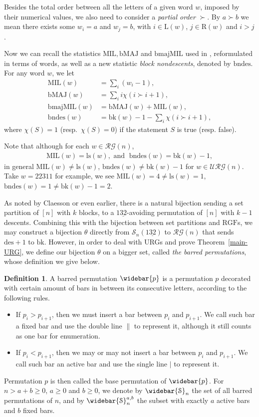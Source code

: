 \documentclass[12pt]{amsart}
\numberwithin{equation}{section}
\theoremstyle{plain}
\theoremstyle{definition}
\newtheorem{Def}[theorem]{Definition}
\def\MIL{\mathrm{MIL}}
\def\des{\mathrm{des}}
\def\bk{\mathrm{bk}}
\def\RGF{\mathrm{RGF}}
\def\bMAJ{\mathrm{bMAJ}}
\def\bmajMIL{\mathrm{bmajMIL}}
\def\bndes{\mathrm{bndes}}
\def\ls{\mathrm{ls}}
\def\LL{\mathrm{L}}
\def\RR{\mathrm{R}}
\def\SS{\mathcal{S}}
\def\RG{\mathcal{RG}}
\def\URG{\mathcal{URG}}
\begin{document}
Besides the total order between all the letters of a given word $w$, imposed by their numerical values, we also need to consider a \emph{partial order} $\succ$. By $a\succ b$ we mean there exists some $w_i=a$ and $w_j=b$, with $i\in\LL(w)$, $j\in\RR(w)$ and $i>j$.

Now we can recall the statistics $\MIL, \bMAJ$ and $\bmajMIL$ used in \cite{Ste}, reformulated in terms of words, as well as a new statistic \emph{block nondescents}, denoted by $\bndes$. For any word $w$, we let
\begin{align*}
\MIL(w) &=\sum_i (w_i-1),\\
\bMAJ(w) &=\sum_i i\chi(i\succ i+1),\\
\bmajMIL(w) &=\bMAJ(w)+\MIL(w),\\
\bndes(w) &=\bk(w)-1-\sum_i \chi(i\succ i+1),
\end{align*}
where $\chi(S)=1$ (resp.~$\chi(S)=0$) if the statement $S$ is true (resp. false).


Note that although for each $w\in\RG(n)$,
\begin{align}\label{mil=ls,bndes=k-1}
\MIL(w)=\ls(w), \text{ and }\; \bndes(w)=\bk(w)-1,
\end{align}
in general $\MIL(w)\neq \ls(w)$, $\bndes(w)\neq\bk(w)-1$ for $w\in\URG(n)$. Take $w=22311$ for example, we see $\MIL(w)=4\neq\ls(w)=1$, $\bndes(w)=1\neq\bk(w)-1=2$.

As noted by Claesson \cite[Proposition~3]{Cl} or even earlier, there is a natural bijection sending a set partition of $[n]$ with $k$ blocks, to a $1\underline{32}$-avoiding permutation of $[n]$ with $k-1$ descents. Combining this with
the bijection between set partitions and $\RGF$s, we may construct
a bijection $\theta$ directly from $\SS_n(1\underline{32})$ to $\RG(n)$ that sends $\des+1$ to $\bk$. However, in order to deal with URGs and prove Theorem~\ref{main-URG}, we define our bijection $\theta$ on a bigger set, called \emph{the barred permutations}, whose definition we give below.
\begin{Def}
A barred permutation $\widebar{p}$ is a permutation $p$ decorated with certain amount of bars in between its consecutive letters, according to the following rules.
\begin{itemize}
	\item If $p_i>p_{i+1}$, then we must insert a bar between $p_i$ and $p_{i+1}$. We call such bar a fixed bar and use the double line $\parallel$ to represent it, although it still counts as one bar for enumeration.
	\item If $p_i<p_{i+1}$, then we may or may not insert a bar between $p_i$ and $p_{i+1}$. We call such bar an active bar and use the single line $\mid$ to represent it.
\end{itemize}
Permutation $p$ is then called the base permutation of $\widebar{p}$. For $n>a+b\ge 0$, $a\ge 0$ and $b\ge 0$, we denote by $\widebar{\SS}_n$ the set of all barred permutations of $n$, and by $\widebar{\SS}_n^{a,b}$ the subset with exactly $a$ active bars and $b$ fixed bars.
\end{Def}
\end{document}
